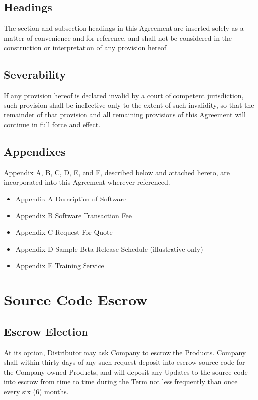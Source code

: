\documentclass[letterpaper,10pt,english]{sphinxmanual}
\begin{document}
\section{Headings}
\label{\detokenize{miscellaneous:headings}}
The section and subsection headings in this Agreement are inserted solely as a matter of convenience and for reference, and shall not be considered in the construction or interpretation of any provision hereof


\section{Severability}
\label{\detokenize{miscellaneous:severability}}
If any provision hereof is declared invalid by a court of competent jurisdiction, such provision shall be ineffective only to the extent of such invalidity, so that the remainder of that provision and all remaining provisions of this Agreement will continue in full force and effect.


\section{Appendixes}
\label{\detokenize{miscellaneous:appendixes}}
Appendix A, B, C, D, E, and F, described below and attached hereto, are incorporated into this Agreement wherever referenced.
\begin{itemize}
\item {} 
Appendix A    Description of Software

\item {} 
Appendix B    Software Transaction Fee

\item {} 
Appendix C    Request For Quote

\item {} 
Appendix D    Sample Beta Release Schedule (illustrative only)

\item {} 
Appendix E    Training Service

\end{itemize}


\chapter{Source Code Escrow}
\label{\detokenize{escrow:source-code-escrow}}\label{\detokenize{escrow::doc}}

\section{Escrow Election}
\label{\detokenize{escrow:escrow-election}}
At its option, Distributor may ask Company to escrow the Products.  Company shall within thirty days of any such request deposit into escrow source code for the Company-owned Products, and will deposit any Updates to the source code into escrow from time to time during the Term not less frequently than once every six (6) months.
\end{document}
